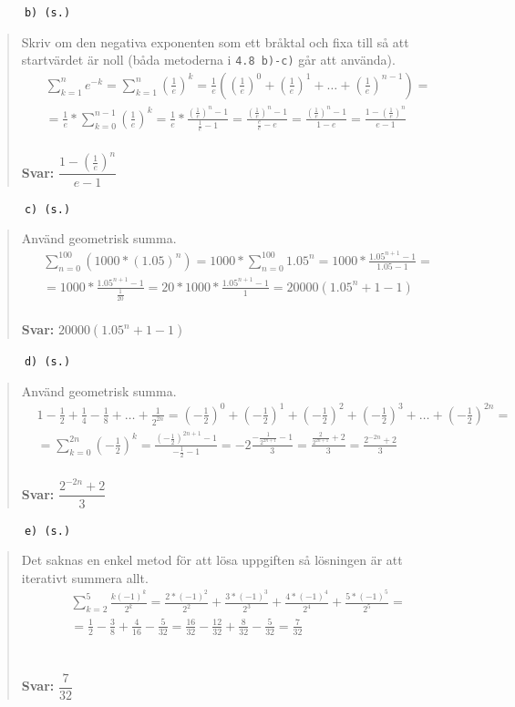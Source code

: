 \documentclass[a4paper]{article}
\newcommand{\tskcol}[1]{\textcolor{tskcol}{#1}}
\begin{document}
	\texttt{\tskcol{~~~~~~b) (s.)}}
	\begin{quotation}
		\noindent
		Skriv om den negativa exponenten som ett bråktal och fixa till så att startvärdet är noll (båda metoderna i \texttt{\tskcol{4.8 b)-c)}} går att använda).
		\begin{align*}
		&\sum_{k=1}^{n}e^{-k}=
		\sum_{k=1}^{n}\left(\tfrac{1}{e}\right)^k=
		\tfrac{1}{e}(\left(\tfrac{1}{e}\right)^0+\left(\tfrac{1}{e}\right)^1+\ldots+\left(\tfrac{1}{e}\right)^{n-1})= \\
		&=\tfrac{1}{e}*\sum_{k=0}^{n-1}\left(\tfrac{1}{e}\right)^k=
		\tfrac{1}{e}*\frac{\left(\frac{1}{e}\right)^n-1}{\frac{1}{e}-1}=
		\frac{\left(\frac{1}{e}\right)^n-1}{\frac{e}{e}-e}=
		\frac{\left(\frac{1}{e}\right)^n-1}{1-e}=
		\frac{1-\left(\frac{1}{e}\right)^n}{e-1}
		\end{align*}
		\\
		\textbf{Svar:} $\dfrac{1-\left(\frac{1}{e}\right)^n}{e-1}$
	\end{quotation}
	
	\texttt{\tskcol{~~~~~~c) (s.)}}
	\begin{quotation}
		\noindent
		Använd geometrisk summa.
		\begin{align*}
		&\sum_{n=0}^{100}(1000*(1.05)^n)=
		1000*\sum_{n=0}^{100}1.05^n=
		1000*\frac{1.05^{n+1}-1}{1.05-1}= \\
		&=1000*\frac{1.05^{n+1}-1}{\frac{1}{20}}=
		20*1000*\frac{1.05^{n+1}-1}{1}=
		20000(1.05^n+1-1)
		\end{align*}
		\\
		\textbf{Svar:} $20000(1.05^n+1-1)$
	\end{quotation}
	
	\texttt{\tskcol{~~~~~~d) (s.)}}
	\begin{quotation}
		\noindent
		Använd geometrisk summa.
		\begin{align*}
		&1-\frac{1}{2}+\frac{1}{4}-\frac{1}{8}+\ldots+\frac{1}{2^{2n}}=
		(-\tfrac{1}{2})^0+(-\tfrac{1}{2})^1+(-\tfrac{1}{2})^2+(-\tfrac{1}{2})^3+\ldots+(-\tfrac{1}{2})^{2n}= \\
		&=\sum_{k=0}^{2n}(-\tfrac{1}{2})^k=
		\frac{(-\frac{1}{2})^{2n+1}-1}{-\frac{1}{2}-1}=
		-2\frac{-\frac{1}{2^{2n+1}}-1}{3}=
		\frac{\frac{2}{2^{2n+1}}+2}{3}=
		\frac{2^{-2n}+2}{3}
		\end{align*}
		\\
		\textbf{Svar:} $\dfrac{2^{-2n}+2}{3}$
	\end{quotation}
	
	\texttt{\tskcol{~~~~~~e) (s.)}}
	\begin{quotation}
		\noindent
		Det saknas en enkel metod för att lösa uppgiften så lösningen är att iterativt summera allt.
		\begin{align*}
		&\sum_{k=2}^{5}\frac{k(-1)^k}{2^k}=
		\frac{2*(-1)^2}{2^2}+\frac{3*(-1)^3}{2^3}+\frac{4*(-1)^4}{2^4}+\frac{5*(-1)^5}{2^5}= \\
		&=\frac{1}{2}-\frac{3}{8}+\frac{4}{16}-\frac{5}{32}=
		\frac{16}{32}-\frac{12}{32}+\frac{8}{32}-\frac{5}{32}=
		\frac{7}{32}
		\end{align*}
		\\ \\
		\textbf{Svar:} $\dfrac{7}{32}$
	\end{quotation}
	
\end{document}
